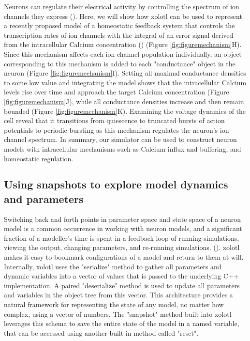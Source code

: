 \documentclass{frontiersSCNS} %
\begin{document}
Neurons can regulate their electrical activity by controlling the spectrum of ion channels they express (\cite{macleanActivityIndependentHomeostasisRhythmically2003, turrigianoSelectiveRegulationCurrent1995, schulzVariableChannelExpression2006}). Here, we will show how xolotl can be used to represent a recently proposed model of a homeostatic feedback system that controls the transcription rates of ion channels with the integral of an error signal derived from the intracellular Calcium concentration (\cite{olearyCorrelationsIonChannel2013, olearyCellTypesNetwork2014}) (Figure \ref{fig:figuremechanism}H). Since this mechanism affects each ion channel population individually, an object corresponding to this mechanism is added to each "conductance" object in the neuron (Figure \ref{fig:figuremechanism}I). Setting all maximal conductance densities to some low value and integrating the model shows that the intracellular Calcium levels rise over time and approach the target Calcium concentration (Figure \ref{fig:figuremechanism}J), while all conductance densities increase and then remain bounded (Figure \ref{fig:figuremechanism}K). Examining the voltage dynamics of the cell reveal that it transitions from quiescence to truncated bursts of action potentials to periodic bursting as this mechanism regulates the neuron's ion channel spectrum. In summary, our simulator can be used to construct neuron models with intracellular mechanisms such as Calcium influx and buffering, and homeostatic regulation.  




%
%
%
%
%




\subsection{Using snapshots to explore model dynamics and parameters}

Switching back and forth points in parameter space and state space of a neuron model is a common occurrence in working with neuron models, and a significant fraction of a modeller's time is spent in a feedback loop of running simulations, viewing the output, changing parameters, and re-running simulations. (\cite{deschutterConsumerGuideNeuronal1992}). xolotl makes it easy to bookmark configurations of a model and return to them at will. Internally, xolotl uses the "serialize" method to gather all parameters and dynamic variables into a vector of values that is passed to the underlying C++ implementation. A paired "deserialize" method is used to update all parameters and variables in the object tree from this vector. This architecture provides a natural framework for representing the state of any model, no matter how complex, using a vector of numbers. The "snapshot" method built into xolotl leverages this schema to save the entire state of the model in a named variable, that can be accessed using another built-in method called "reset".
\end{document}

